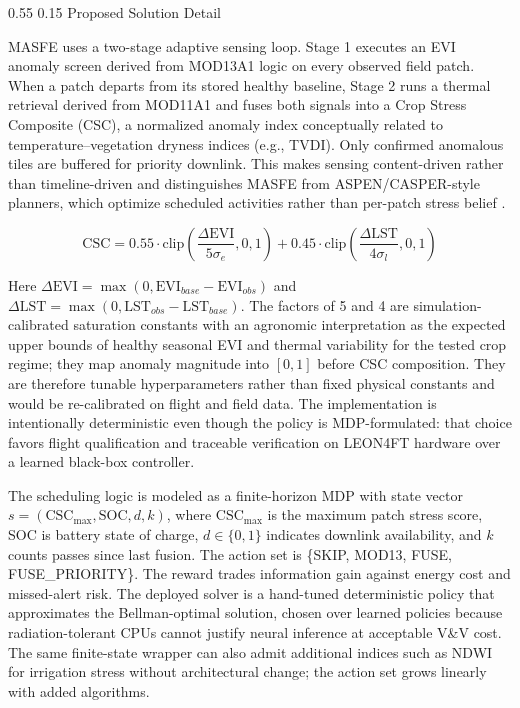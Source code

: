 \documentclass[11pt,letterpaper]{article}
\makeatletter
\renewcommand\section{\@startsection{section}{1}{\z@}
  {0.55\baselineskip}
  {0.15\baselineskip}
  {\normalfont\large\bfseries}}
\makeatother
\begin{document}
\section{Proposed Solution Detail}

MASFE uses a two-stage adaptive sensing loop. Stage 1 executes an EVI anomaly screen derived from MOD13A1 logic on every observed field patch. When a patch departs from its stored healthy baseline, Stage 2 runs a thermal retrieval derived from MOD11A1 and fuses both signals into a Crop Stress Composite (CSC), a normalized anomaly index conceptually related to temperature--vegetation dryness indices (e.g., TVDI). Only confirmed anomalous tiles are buffered for priority downlink. This makes sensing content-driven rather than timeline-driven and distinguishes MASFE from ASPEN/CASPER-style planners, which optimize scheduled activities rather than per-patch stress belief \cite{jpl-scheduling,eo1-autonomy}.

\begin{equation}
\text{CSC} = 0.55 \cdot \text{clip}\!\left(\frac{\Delta\text{EVI}}{5\sigma_e}, 0, 1\right)
           + 0.45 \cdot \text{clip}\!\left(\frac{\Delta\text{LST}}{4\sigma_l}, 0, 1\right)
\label{eq:csc}
\end{equation}

Here $\Delta\text{EVI} = \max(0, \text{EVI}_{base} - \text{EVI}_{obs})$ and $\Delta\text{LST} = \max(0, \text{LST}_{obs} - \text{LST}_{base})$. The factors of 5 and 4 are simulation-calibrated saturation constants with an agronomic interpretation as the expected upper bounds of healthy seasonal EVI and thermal variability for the tested crop regime; they map anomaly magnitude into $[0,1]$ before CSC composition. They are therefore tunable hyperparameters rather than fixed physical constants and would be re-calibrated on flight and field data. The implementation is intentionally deterministic even though the policy is MDP-formulated: that choice favors flight qualification and traceable verification on LEON4FT hardware over a learned black-box controller.

The scheduling logic is modeled as a finite-horizon MDP with state vector $s = (\text{CSC}_{\max}, \text{SOC}, d, k)$, where $\text{CSC}_{\max}$ is the maximum patch stress score, SOC is battery state of charge, $d \in \{0,1\}$ indicates downlink availability, and $k$ counts passes since last fusion. The action set is \{SKIP, MOD13, FUSE, FUSE\_PRIORITY\}. The reward trades information gain against energy cost and missed-alert risk. The deployed solver is a hand-tuned deterministic policy that approximates the Bellman-optimal solution, chosen over learned policies because radiation-tolerant CPUs cannot justify neural inference at acceptable V\&V cost. The same finite-state wrapper can also admit additional indices such as NDWI for irrigation stress without architectural change; the action set grows linearly with added algorithms.
\end{document}
